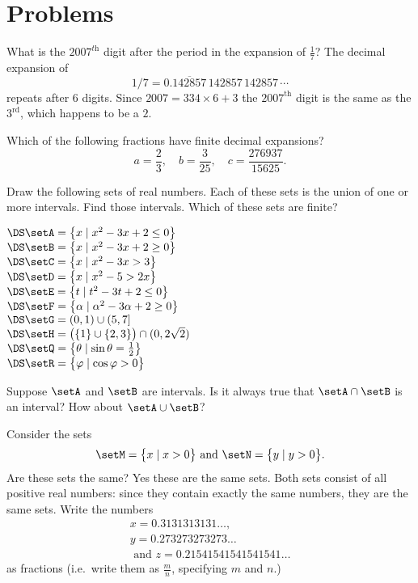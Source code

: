 \section{Problems}
\problemfont
\begin{multicols}{2}\setlength{\parindent}{0pt}
\problem What is the $2007^{\textit{th}}$ digit after the period in the expansion
of $\frac17$?
\answer
The decimal expansion of
\[
1/7 = 0.\overline{142857}\,142857\,142857\,\cdots
\]
repeats after 6 digits.  Since $2007 =
334\times6+3$ the $2007^{\textrm{th}}$ digit is the same as the
$3^{\textrm{rd}}$, which happens to be a $2$.
\endanswer

\problem Which of the following fractions have finite decimal expansions?
\[
a=\frac 23, \quad b=\frac 3{25},\quad c=\frac{276937}{15625}.
\]

\problem Draw the following sets of real numbers.  Each of these sets is
the union of one or more intervals.  Find those intervals.  Which of these
sets are finite?

\noindent%
\(\DS\setA = \bigl\{x \mid x^2-3x+2\leq 0\bigr\} \)\\
\(\DS\setB = \bigl\{x \mid x^2-3x+2\geq 0\bigr\}\)\\
\(\DS\setC = \bigl\{x \mid x^2-3x > 3\bigr\} \)\\
\(\DS\setD = \bigl\{x \mid x^2-5>2x\bigr\} \)\\
\(\DS\setE = \bigl\{t \mid t^2-3t+2\leq0\bigr\} \)\\
\(\DS\setF = \bigl\{\alpha \mid \alpha^2-3\alpha+2\geq 0\bigr\}\)\\
\(\DS\setG = (0, 1)\cup (5, 7] \)\\
\(\DS\setH = \bigl( \{1\}\cup\{2,3\} \bigr)\cap (0, 2\sqrt2)\)\\
\(\DS\setQ = \bigl\{\theta \mid \sin\theta=\tfrac12\bigr\} \)\\
\(\DS\setR = \bigl\{\varphi\mid \cos\varphi>0\bigr\}\)

\problem Suppose $\setA$ and $\setB$ are intervals.  Is it always true that
$\setA\cap\setB$ is an interval?  How about $\setA\cup\setB$?



\problem Consider the sets
\[
\setM = \bigl\{x \mid x>0\bigr\} \text{ and }
\setN =  \bigl\{y \mid y>0\bigr\}.
\]
Are these sets the same?
\answer
Yes these are the same sets.  Both sets consist of all positive real
numbers: since they contain exactly the same numbers, they are the
same sets.
\endanswer
\problem \groupproblem
Write the numbers
\begin{gather*}
  x=0.3131313131\dots,\\
  y=0.273273273273\dots\\
  \text{ and }
  z=0.21541541541541541\dots
\end{gather*}
as fractions (i.e.\ write them as $\frac mn$, specifying $m$ and
$n$.)


\end{multicols}
